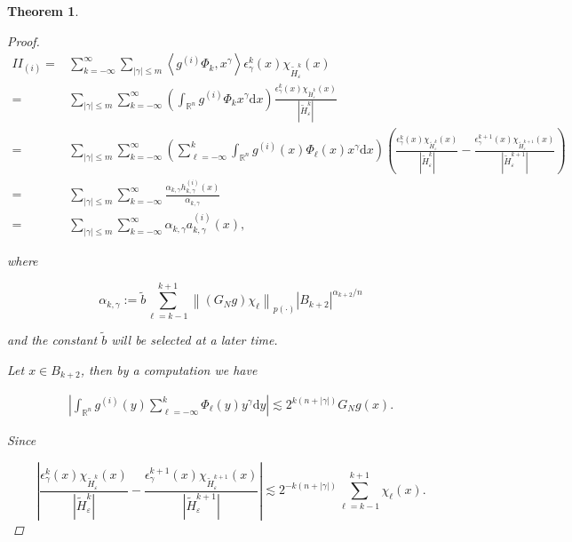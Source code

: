 \documentclass[oneside,reqno]{amsart}
\newtheorem{theorem}{Theorem}[section]
\numberwithin{equation}{section}
\theoremstyle{definition}
\begin{document}
\begin{theorem}
\begin{proof}
\begin{align*}
I I_{(i)}= & \sum_{k=-\infty}^{\infty} \sum_{|\gamma| \leq  m}\left\langle g^{(i)} \Phi_{k}, x^{\gamma}\right\rangle \epsilon  _{\gamma}^{k}(x) \chi_{\widetilde{H}^k_{ \varepsilon}}(x) \\
= & \sum_{|\gamma| \leq  m} \sum_{k=-\infty}^{\infty}\left(\int_{\mathbb{R}^{n}} g^{(i)} \Phi_{k} x^{\gamma} \mathrm{d} x\right) \frac{\epsilon  _{\gamma}^{k}(x) \chi_{\widetilde{H}^k_{ \varepsilon}}(x)}{\left|\widetilde{H}^k_{ \varepsilon}\right|} \\
= & \sum_{|\gamma| \leq  m} \sum_{k=-\infty}^{\infty}\left(\sum_{\ell=-\infty }^{k} \int_{\mathbb{R}^{n}} g^{(i)}(x) \Phi_\ell (x) x^{\gamma} \mathrm{d} x\right)\left(\frac{\epsilon  _{\gamma}^{k}(x) \chi_{\widetilde{H}^k_{ \varepsilon}}(x)}{\left|\widetilde{H}^k_{ \varepsilon}\right|}-\frac{\epsilon  _{\gamma}^{k+1}(x) \chi_{\widetilde{H}^{k+1}_{ \varepsilon}}(x)}{\left|\widetilde{H}^{k+1}_{ \varepsilon}\right|}\right) \\
= & \sum_{|\gamma| \leq  m} \sum_{k=-\infty}^{\infty} \frac{\alpha_{k, \gamma} h_{k, \gamma}^{(i)}(x)}{\alpha_{k, \gamma}} \\
= & \sum_{|\gamma| \leq  m} \sum_{k=-\infty}^{\infty} \alpha_{k, \gamma} a_{k, \gamma}^{(i)}(x),
\end{align*}


where


\begin{equation*}
\alpha_{k, \gamma}:=\widetilde{b} \sum_{\ell=k-1}^{k+1}\left\|\left(G_{N}g \right) \chi_\ell \right\|_{{p(\cdot)}}\left|B_{k+2}\right|^{\alpha_{k+2} / n} 
\end{equation*}


and the constant $\widetilde{b}$ will be selected at a later time. 


Let $x \in B_{k+2}$, then by a computation we have

\[
\begin{array}{r}
\left|\int_{\mathbb{R}^{n}} g^{(i)}(y) \sum_{\ell=-\infty }^{k} \Phi_\ell (y) y^{\gamma} \mathrm{d} y\right| \lesssim 2^{k(n+|\gamma|)} G_{N}g (x) .
\end{array}
\]

Since


\begin{equation*}
\left|\frac{\epsilon  _{\gamma}^{k}(x) \chi_{\widetilde{H}^k_{ \varepsilon}}(x)}{\left|\widetilde{H}^k_{ \varepsilon}\right|}-\frac{\epsilon  _{\gamma}^{k+1}(x) \chi_{\widetilde{H}^{k+1}_{ \varepsilon}}(x)}{\left|\widetilde{H}^{k+1}_{ \varepsilon}\right|}\right| \lesssim 2^{-k(n+|\gamma|)} \sum_{\ell=k-1}^{k+1} \chi_\ell (x) . 
\end{equation*}



\end{proof}
\end{theorem}
\end{document}

